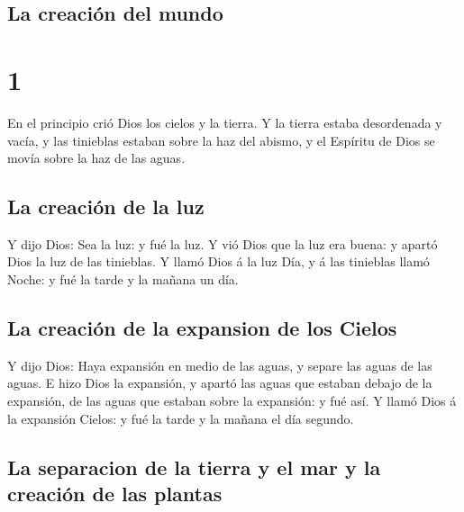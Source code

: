 \hypertarget{la-creaciuxf3n-del-mundo}{%
\subsection{La creación del mundo}\label{la-creaciuxf3n-del-mundo}}

\hypertarget{section}{%
\section{1}\label{section}}

 En el principio crió Dios los cielos y la tierra.
 Y la tierra estaba desordenada y vacía, y las tinieblas
estaban sobre la haz del abismo, y el Espíritu de Dios se movía sobre la
haz de las aguas.

\hypertarget{la-creaciuxf3n-de-la-luz}{%
\subsection{La creación de la luz}\label{la-creaciuxf3n-de-la-luz}}

 Y dijo Dios: Sea la luz: y fué la luz.  Y
vió Dios que la luz era buena: y apartó Dios la luz de las tinieblas.
 Y llamó Dios á la luz Día, y á las tinieblas llamó Noche:
y fué la tarde y la mañana un día.

\hypertarget{la-creaciuxf3n-de-la-expansion-de-los-cielos}{%
\subsection{La creación de la expansion de los
Cielos}\label{la-creaciuxf3n-de-la-expansion-de-los-cielos}}

 Y dijo Dios: Haya expansión en medio de las aguas, y
separe las aguas de las aguas.  E hizo Dios la expansión,
y apartó las aguas que estaban debajo de la expansión, de las aguas que
estaban sobre la expansión: y fué así.  Y llamó Dios á la
expansión Cielos: y fué la tarde y la mañana el día segundo.

\hypertarget{la-separacion-de-la-tierra-y-el-mar-y-la-creaciuxf3n-de-las-plantas}{%
\subsection{La separacion de la tierra y el mar y la creación de las
plantas}\label{la-separacion-de-la-tierra-y-el-mar-y-la-creaciuxf3n-de-las-plantas}}

